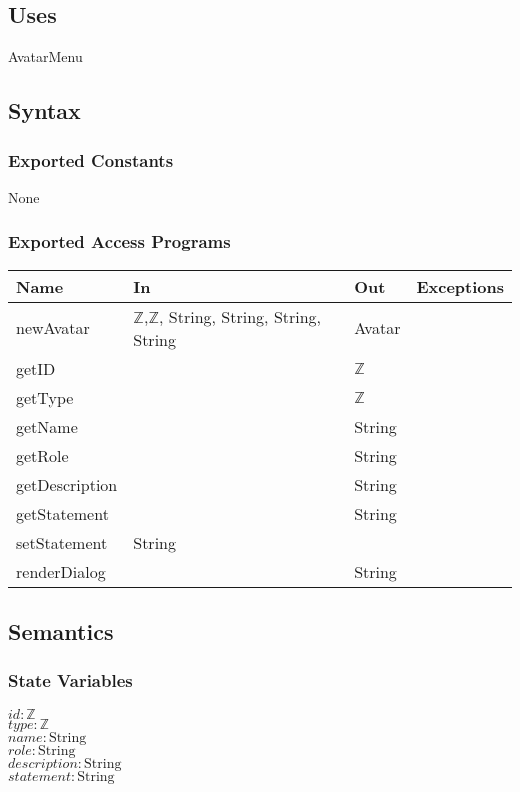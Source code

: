 \documentclass[12pt, titlepage]{article}
\begin{document}
\subsection{Uses}
AvatarMenu


\subsection{Syntax}

\subsubsection{Exported Constants}
None

\subsubsection{Exported Access Programs}

\begin{center}
\begin{tabular}{p{3cm} p{4cm} p{4cm} p{2cm}}
\hline
\textbf{Name} & \textbf{In} & \textbf{Out} & \textbf{Exceptions} \\
\hline
newAvatar & $\mathbb{Z}$,$\mathbb{Z}$, String, String, String, String & Avatar & \\
\hline
getID &  & $\mathbb{Z}$ & \\
\hline
getType &  & $\mathbb{Z}$ & \\
\hline
getName &  & String & \\
\hline
getRole &  & String & \\
\hline
getDescription &  & String & \\
\hline
getStatement &  & String & \\
\hline
setStatement &  String &  & \\
\hline
renderDialog &   & String & \\
\hline
\end{tabular}
\end{center}

\subsection{Semantics}

\subsubsection{State Variables}
$\mathit{id}: \text{$\mathbb{Z}$}$\\
$\mathit{type}: \text{$\mathbb{Z}$}$\\
$\mathit{name}: \text{String}$\\
$\mathit{role}: \text{String}$\\
$\mathit{description}: \text{String}$\\
$\mathit{statement}: \text{String}$\\
\end{document}
